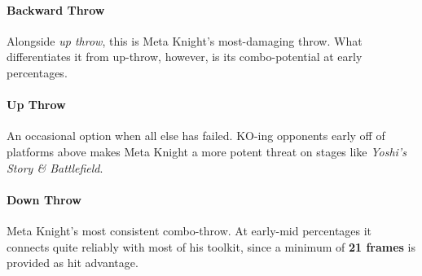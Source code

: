 \paragraph{Backward Throw}
Alongside \textit{up throw}, this is Meta Knight's most-damaging throw. What differentiates it from up-throw, however, is its combo-potential at early percentages.
\paragraph{Up Throw}
An occasional option when all else has failed. KO-ing opponents early off of platforms above makes Meta Knight a more potent threat on stages like \textit{Yoshi's Story \& Battlefield}.
\paragraph{Down Throw}
Meta Knight's most consistent combo-throw. At early-mid percentages it connects quite reliably with most of his toolkit, since a minimum of \textbf{21 frames} is provided as hit advantage.